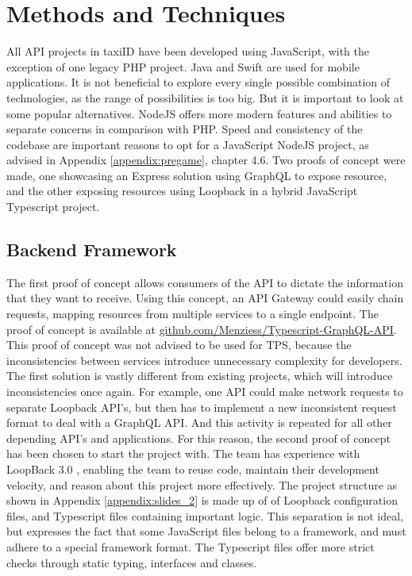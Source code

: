 %
\section{Methods and Techniques}
All API projects in taxiID have been developed using JavaScript, with the exception of one legacy PHP project. Java and Swift are used for mobile applications. It is not beneficial to explore every single possible combination of technologies, as the range of possibilities is too big. But it is important to look at some popular alternatives. NodeJS offers more modern features and abilities to separate concerns in comparison with PHP. Speed and consistency of the codebase are important reasons to opt for a JavaScript NodeJS project, as advised in Appendix \ref{appendix:pregame}, chapter 4.6. Two proofs of concept were made, one showcasing an Express solution using GraphQL to expose resource, and the other exposing resources using Loopback in a hybrid JavaScript Typescript project.

\subsection{Backend Framework}
The first proof of concept allows consumers of the API to dictate the information that they want to receive. Using this concept, an API Gateway could easily chain requests, mapping resources from multiple services to a single endpoint. The proof of concept is available at \url{github.com/Menziess/Typescript-GraphQL-API}. This proof of concept was not advised to be used for TPS, because the inconsistencies between services introduce unnecessary complexity for developers. The first solution is vastly different from existing projects, which will introduce inconsistencies once again. For example, one API could make network requests to separate Loopback API's, but then has to implement a new inconsistent request format to deal with a GraphQL API. And this activity is repeated for all other depending API's and applications. For this reason, the second proof of concept has been chosen to start the project with. The team has experience with LoopBack 3.0 \cite{lb}, enabling the team to reuse code, maintain their development velocity, and reason about this project more effectively. The project structure as shown in Appendix \ref{appendix:slides_2} is made up of of Loopback configuration files, and Typescript files containing important logic. This separation is not ideal, but expresses the fact that some JavaScript files belong to a framework, and must adhere to a special framework format. The Typescript files offer more strict checks through static typing, interfaces and classes.

